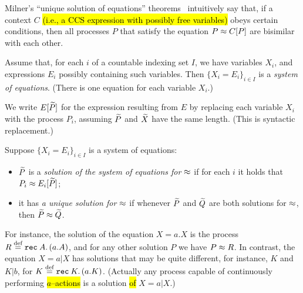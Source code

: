 Milner's ``unique solution of equations'' theorems~\cite{Mil89} intuitively
say that, if a context $C$ \hl{(i.e., a CCS expression with possibly
free variables)} obeys certain conditions,
then all processes $P$ that satisfy the equation $P \approx C [P]$ are
bisimilar with each other.


\begin{definition} %
Assume that, for each $i$ of 
 a countable indexing set $I$, we have variables $X_i$, and expressions
$E_i$ possibly containing  such variables. 
Then 
$\{  X_i = E_i\}_{i\in I}$
is 
  a \emph{system of equations}. (There is one equation for each variable $X_i$.)
\end{definition}

We write $E[\widetilde P]$ for the expression resulting from $E$ by
replacing each variable $X_i$   with the process $P_i$, assuming
$\widetilde P$ and $\widetilde X$ have the same length. (This is syntactic
replacement.) 
\begin{definition}
Suppose  $\{  X_i = E_i\}_{i\in I}$ is a system of equations: 
\begin{itemize}
\item
 $\widetilde P$ is a \emph{solution of the 
system of equations  for $\approx$} 
if for each $i$ it holds
that $P_i \approx E_i [\widetilde P]$;

\item it %
 has \emph{a unique solution for $\approx$}  if whenever 
 $\widetilde P$ and $\widetilde Q$ are both solutions for $\approx$, then $\widetilde P \approx
 \widetilde Q$. 
\end{itemize} 
 \end{definition} 




For instance, the solution of the equation 
$ X = a. X$ 
is  the process
$R \stackrel{\mbox{\scriptsize def}}{=} {\tt rec}\: A . \, (a. A)$, and for any other solution $P$ we have $P \approx R$.
In contrast, the equation 
 $X = a|  X$ has solutions that may be quite different, for instance,
 $K$ and $K | b$, for $K \stackrel{\mbox{\scriptsize def}}{=} {\tt rec}\: K . \, (a. K)$. (Actually any process capable of
continuously performing \hl{$a$--actions} is a solution \hl{of} $X = a  |  X$.)

